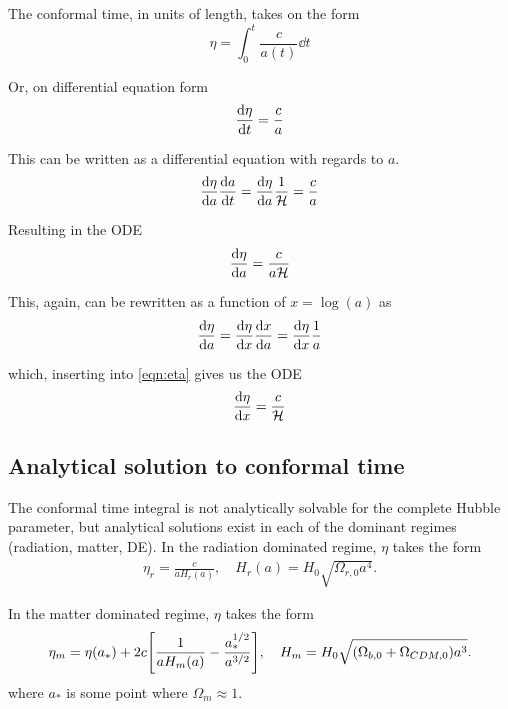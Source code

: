 \documentclass[10pt, a4paper]{article}
\begin{document}
The conformal time, in units of length, takes on the form
\begin{equation}
    \eta = \int_0^t \frac{c}{a(t)} \dd{t}
\end{equation}

Or, on differential equation form
\begin{equation}
    \dv{\eta}{t} = \frac{c}{a}
\end{equation}

This can be written as a differential equation with regards to $a$.
\begin{equation*}
    \dv{\eta}{a}\dv{a}{t} = \dv{\eta}{a}\frac{1}{\mathcal{H}} = \frac{c}{a}
\end{equation*}

Resulting in the ODE
\begin{align}\label{eqn:eta}
    \dv{\eta}{a} = \frac{c}{a\mathcal{H}}
\end{align}

This, again, can be rewritten as a function of $x = \log(a)$ as
\begin{align*}
    \dv{\eta}{a} = \dv{\eta}{x}\dv{x}{a} = \dv{\eta}{x}\frac{1}{a}
\end{align*}

which, inserting into \ref{eqn:eta} gives us the ODE
\begin{align}\label{eqn:etaODE}
    \dv{\eta}{x} = \frac{c}{\mathcal{H}}
\end{align}


\subsection{Analytical solution to conformal time}\label{sec:conf}
The conformal time integral is not analytically solvable for the complete Hubble parameter, but analytical solutions exist in each of the dominant regimes (radiation, matter, DE). In the radiation dominated regime, $\eta$ takes the form
\begin{align}
    \eta_r = \frac{c}{aH_r(a)},  \quad  H_r(a) = H_0\sqrt{\Omega_{r,0} a^{4}}.
\end{align}

In the matter dominated regime, $\eta$ takes the form
\begin{align}
    \eta_m = \eta(a_*) + 2c\qty[\frac{1}{aH_m(a)} - \frac{a_*^{1/2}}{a^{3/2}}], \quad H_m = H_0\sqrt{(\Omega_{b,0} + \Omega_{CDM,0}) a^3}.
\end{align}
where $a_*$ is some point where $\Omega_m \approx 1$.
\end{document}
